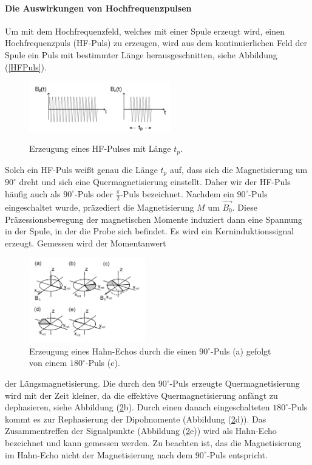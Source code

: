 \paragraph{Die Auswirkungen von Hochfrequenzpulsen}
Um mit dem Hochfrequenzfeld, welches mit einer Spule erzeugt wird, einen Hochfrequenzpuls (HF-Puls) zu erzeugen, wird aus dem kontinuierlichen Feld der Spule ein Puls mit bestimmter L\"{a}nge herausgeschnitten, siehe Abbildung (\ref{HFPuls}).
\begin{figure}[hbtp]
	\centering
	\vspace{-10pt}
	\includegraphics[width=0.55\textwidth]{Plots/HFPuls.png} 
	\label{HFpuls}
	\caption{Erzeugung eines HF-Pulses mit L\"{a}nge $t_p$.}
\end{figure}
Solch ein HF-Puls wei{\ss}t genau die L\"{a}nge $t_p$ auf, dass sich die Magnetisierung um $90^{\circ}$ dreht und sich eine Quermagnetisierung einstellt.
Daher wir der HF-Puls h\"{a}ufig auch als $90^{\circ}$-Puls oder $\frac{\pi}{2}$-Puls bezeichnet.
Nachdem ein $90^{\circ}$-Puls eingeschaltet wurde, pr\"{a}zediert die Magnetisierung $M$ um $\overrightarrow{B_0}$.
Diese Pr\"{a}zessionsbewegung der magnetischen Momente induziert dann eine Spannung in der Spule, in der die Probe sich befindet.
Es wird ein Kerninduktionssignal erzeugt.
Gemessen wird der Momentanwert 
\begin{figure}
	\vspace{-10pt}
	\centering
	\includegraphics[width=0.45\textwidth]{Plots/hahnEcho.png} 
	\caption{Erzeugung eines Hahn-Echos durch die einen $90^{\circ}$-Puls (a) gefolgt von einem $180^{\circ}$-Puls (c).}
	\label{HahnEcho}
\end{figure}
der L\"{a}ngsmagnetisierung.
Die durch den $90^{\circ}$-Puls erzeugte Quermagnetisierung wird mit der Zeit kleiner, da die effektive Quermagnetisierung anf\"{a}ngt zu dephasieren, siehe Abbildung (\ref{HahnEcho}b).
Durch einen danach eingeschalteten $180^{\circ}$-Puls kommt es zur Rephasierung der Dipol{\-}mo{\-}men{\-}te (Abbildung (\ref{HahnEcho}d)).
Das Zusam{\-}men{\-}tref{\-}fen der Signalpunkte (Abbildung (\ref{HahnEcho}e)) wird als Hahn-Echo bezeichnet und kann gemessen werden.
Zu beachten ist, das die Magnetisierung im Hahn-Echo nicht der Magnetisierung nach dem $90^{\circ}$-Puls entspricht.

